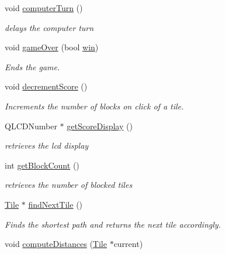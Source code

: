 \begin{DoxyCompactItemize}
void \hyperlink{classGame2Scene_a6cc2a61e06a7c9ed0161dea7994c46cf}{computer\-Turn} ()
\begin{DoxyCompactList}\small\item\em delays the computer turn \end{DoxyCompactList}\item 
void \hyperlink{classGame2Scene_aaabae77c7589656966025ee6b4b3b6de}{game\-Over} (bool \hyperlink{classGame2Scene_ac67be84c6e44a47a4c6cfb914e6ad8b4}{win})
\begin{DoxyCompactList}\small\item\em \-Ends the game. \end{DoxyCompactList}\item 
void \hyperlink{classGame2Scene_a87cbb8341cd337cafc786ac377b6cc15}{decrement\-Score} ()
\begin{DoxyCompactList}\small\item\em \-Increments the number of blocks on click of a tile. \end{DoxyCompactList}\item 
\-Q\-L\-C\-D\-Number $\ast$ \hyperlink{classGame2Scene_a56438bf6f4bbee1c869eae94bca46d03}{get\-Score\-Display} ()
\begin{DoxyCompactList}\small\item\em retrieves the lcd display \end{DoxyCompactList}\item 
int \hyperlink{classGame2Scene_a76a2b32e9c93f1f88fa1b8b2fe87f04c}{get\-Block\-Count} ()
\begin{DoxyCompactList}\small\item\em retrieves the number of blocked tiles \end{DoxyCompactList}\item 
\hypertarget{classGame2Scene_ad38fb186d4d71eb1f5043a9f3486d8b4}{\hyperlink{classTile}{\-Tile} $\ast$ \hyperlink{classGame2Scene_ad38fb186d4d71eb1f5043a9f3486d8b4}{find\-Next\-Tile} ()}\label{classGame2Scene_ad38fb186d4d71eb1f5043a9f3486d8b4}

\begin{DoxyCompactList}\small\item\em \-Finds the shortest path and returns the next tile accordingly. \end{DoxyCompactList}\item 
\hypertarget{classGame2Scene_a02a6d6e7aef7ec61f76788b206240af9}{void \hyperlink{classGame2Scene_a02a6d6e7aef7ec61f76788b206240af9}{compute\-Distances} (\hyperlink{classTile}{\-Tile} $\ast$current)}\label{classGame2Scene_a02a6d6e7aef7ec61f76788b206240af9}


\end{DoxyCompactItemize}
